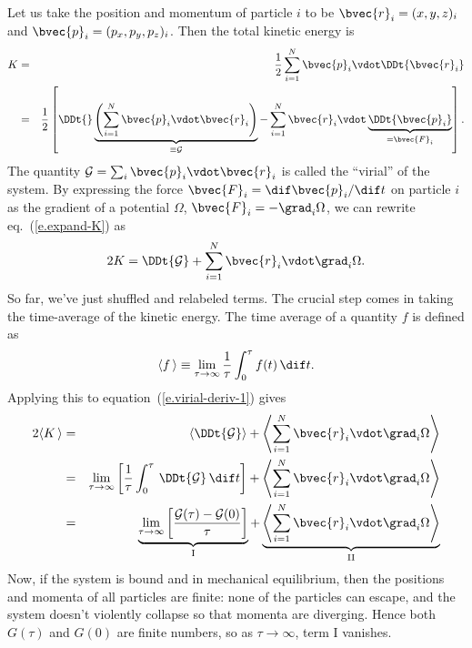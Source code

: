Let us take the position and momentum of particle $i$ to be $\bvec{r}_{i} = (x,y,z)_{i}$ and $\bvec{p}_{i}=(p_{x},p_{y},p_{z})_{i}$.  Then the total kinetic energy is
\begin{eqnarray}
\nonumber
	K &=& \frac{1}{2}\sum_{i=1}^{N}\bvec{p}_{i}\vdot\DDt{\bvec{r}_{i}}\\
		&=& \frac{1}{2}\left[\DDt{}\underbrace{\left(\sum_{i=1}^{N}\bvec{p}_{i}\vdot\bvec{r}_{i}\right)}_{\equiv\mathcal{G}} - \sum_{i=1}^{N}\bvec{r}_{i}\vdot\underbrace{\DDt{\bvec{p}_{i}}}_{=\bvec{F}_{i}}\right].
\label{e.expand-K}
\end{eqnarray}
The quantity $\mathcal{G} = \sum_{i}\bvec{p}_{i}\vdot\bvec{r}_{i}$ is called the ``virial'' of the system.  By expressing the force $\bvec{F}_{i} = \dif\bvec{p}_{i}/\dif t$ on particle $i$ as the gradient of a potential $\Omega$, $\bvec{F}_{i} = -\grad_{i}\Omega$,
we can rewrite eq.~(\ref{e.expand-K}) as
\begin{equation}\label{e.virial-deriv-1}
	2K = \DDt{\mathcal{G}} + \sum_{i=1}^{N}\bvec{r}_{i}\vdot\grad_{i}\Omega.
\end{equation}
So far, we've just shuffled and relabeled terms.  The crucial step comes in taking the time-average of the kinetic energy. The time average of a quantity $f$ is defined as
\[	\langle f\,\rangle \equiv \lim_{\tau\to\infty} \frac{1}{\tau}\int_{0}^{\tau}f(t)\,\dif t. \]
Applying this to equation~(\ref{e.virial-deriv-1}) gives
\begin{eqnarray*}
	2\langle K\,\rangle &=&
		 \left\langle\DDt{\mathcal{G}}\right\rangle 
		+ \left\langle\sum_{i=1}^{N}\bvec{r}_{i}\vdot\grad_{i}\Omega\right\rangle\\
	&=& \lim_{\tau\to\infty}\left[\frac{1}{\tau}\int_{0}^{\tau}\,\DDt{\mathcal{G}}\,\dif t\right] 
		+ \left\langle\sum_{i=1}^{N}\bvec{r}_{i}\vdot\grad_{i}\Omega\right\rangle\\
	&=& \underbrace{\lim_{\tau\to\infty}\left[\frac{\mathcal{G}(\tau)-\mathcal{G}(0)}{\tau}\right]}_{\mathrm{I}}
		+ \underbrace{\left\langle\sum_{i=1}^{N}\bvec{r}_{i}\vdot\grad_{i}\Omega\right\rangle}_{\mathrm{II}}
\end{eqnarray*}
Now, if the system is bound and in mechanical equilibrium, then the positions and momenta of all particles are finite: none of the particles can escape, and the system doesn't violently collapse so that momenta are diverging.  Hence both $G(\tau)$ and $G(0)$ are finite numbers, so as $\tau\to\infty$, term I vanishes.

